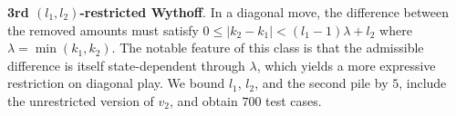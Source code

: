 \documentclass[review]{elsarticle}
\newcommand{\set}[1]{\{ #1 \}}
\newcommand{\tuple}[1]{\langle {#1} \rangle}
\newcommand{\true}{\top}
\newcommand{\statevar}{\mathcal{X}}
\newcommand{\act}{\mathcal{A}}
\newcommand{\constraint}{\mathcal{C}}
\newcommand{\estate}{\mathcal{E}}
\newcommand{\pre}{\mathtt{pre}}
\newcommand{\eff}{\mathtt{eff}}
\begin{document}
{\color{red}\textbf{3rd $(l_1,l_2)$-restricted Wythoff}. In a diagonal move, the difference between the removed amounts must satisfy $0 \le |k_2-k_1| < (l_1-1)\lambda + l_2$ where $\lambda = \min(k_1,k_2)$.}
{\color{red}The notable feature of this class is that the admissible difference is itself state-dependent through $\lambda$, which yields a more expressive restriction on diagonal play.}
{\color{red}We bound $l_1$, $l_2$, and the second pile by $5$, include the unrestricted version of $v_2$, and obtain $700$ test cases.}
\end{document}
